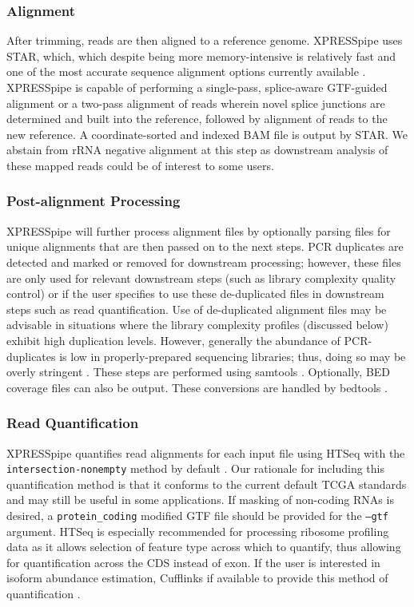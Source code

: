 \documentclass[11pt, a4paper, oneside]{article}
\begin{document}
\subsubsection{Alignment}
After trimming, reads are then aligned to a reference genome. XPRESSpipe uses STAR, which, which despite being more memory-intensive is relatively fast and one of the most accurate sequence alignment options currently available \cite{star, baruzzo_natmeth}. XPRESSpipe is capable of performing a single-pass, splice-aware GTF-guided alignment or a two-pass alignment of reads wherein novel splice junctions are determined and built into the reference, followed by alignment of reads to the new reference. A coordinate-sorted and indexed BAM file is output by STAR. We abstain from rRNA negative alignment at this step as downstream analysis of these mapped reads could be of interest to some users.

\subsubsection{Post-alignment Processing}
XPRESSpipe will further process alignment files by optionally parsing files for unique alignments that are then passed on to the next steps. PCR duplicates are detected and marked or removed for downstream processing; however, these files are only used for relevant downstream steps (such as library complexity quality control) or if the user specifies to use these de-duplicated files in downstream steps such as read quantification. Use of de-duplicated alignment files may be advisable in situations where the library complexity profiles (discussed below) exhibit high duplication levels. However, generally the abundance of PCR-duplicates is low in properly-prepared sequencing libraries; thus, doing so may be overly stringent \cite{umi}. These steps are performed using samtools \cite{samtools}. Optionally, BED coverage files can also be output. These conversions are handled by bedtools \cite{bedtools}.

\subsubsection{Read Quantification}
XPRESSpipe quantifies read alignments for each input file using HTSeq with the \texttt{intersection-nonempty} method by default \cite{htseq, count_benchmark}. Our rationale for including this quantification method is that it conforms to the current default TCGA standards and may still be useful in some applications. If masking of non-coding RNAs is desired, a \texttt{protein\_coding} modified GTF file should be provided for the \texttt{--gtf} argument. HTSeq is especially recommended for processing ribosome profiling data as it allows selection of feature type across which to quantify, thus allowing for quantification across the CDS instead of exon. If the user is interested in isoform abundance estimation, Cufflinks if available to provide this method of quantification \cite{cufflinks, count_benchmark}.
\end{document}
